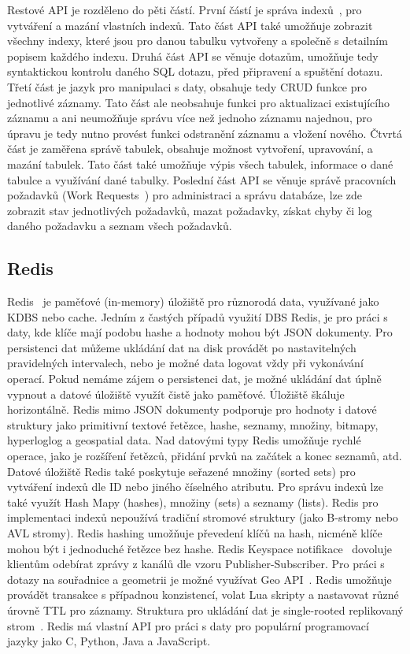 \documentclass[czech,master,dept460,male,csharp,cpdeclaration]{diploma}
\begin{document}
	Restové API je rozděleno do pěti částí. První částí je správa indexů~\cite{index}, pro vytváření a mazání vlastních indexů. Tato část API také umožňuje zobrazit všechny indexy, které jsou pro danou tabulku vytvořeny a společně s detailním popisem každého indexu. Druhá část API se věnuje dotazům, umožňuje tedy syntaktickou kontrolu daného SQL dotazu, před připravení a spuštění dotazu. Třetí část je jazyk pro manipulaci s daty, obsahuje tedy CRUD funkce pro jednotlivé záznamy. Tato část ale neobsahuje funkci pro aktualizaci existujícího záznamu a ani neumožňuje správu více než jednoho záznamu najednou, pro úpravu je tedy nutno provést funkci odstranění záznamu a vložení nového. Čtvrtá část je zaměřena správě tabulek, obsahuje možnost vytvoření, upravování, a mazání tabulek. Tato část také umožňuje výpis všech tabulek, informace o dané tabulce a využívání dané tabulky. Poslední část API se věnuje správě pracovních požadavků (Work Requests~\cite{oracle-work-requests-xd}) pro administraci a správu databáze, lze zde zobrazit stav jednotlivých požadavků, mazat požadavky, získat chyby či log daného požadavku a seznam všech požadavků.
		
	\subsection{Redis} \label{lab-redis}
	
	Redis~\cite{redis} je paměťové (in-memory) úložiště pro různorodá data, využívané jako KDBS nebo cache. Jedním z častých případů využití DBS Redis, je pro práci s daty, kde klíče mají podobu hashe a hodnoty mohou být JSON dokumenty. Pro persistenci dat můžeme ukládání dat na disk provádět po nastavitelných pravidelných intervalech, nebo je možné data logovat vždy při vykonávání operací. Pokud nemáme zájem o persistenci dat, je možné ukládání dat úplně vypnout a datové úložiště využít čistě jako paměťové. Úložiště škáluje horizontálně. Redis mimo JSON dokumenty podporuje pro hodnoty i datové struktury jako primitivní textové řetězce, hashe, seznamy, množiny, bitmapy, hyperloglog a geospatial data. Nad datovými typy Redis umožňuje rychlé operace, jako je rozšíření řetězců, přidání prvků na začátek a konec seznamů, atd. Datové úložiště Redis také poskytuje seřazené množiny (sorted sets) pro vytváření indexů dle ID nebo jiného číselného atributu. Pro správu indexů lze také využít Hash Mapy (hashes), množiny (sets) a seznamy (lists). Redis pro implementaci indexů nepoužívá tradiční stromové struktury (jako B-stromy nebo AVL stromy). Redis hashing umožňuje převedení klíčů na hash, nicméně klíče mohou být i jednoduché řetězce bez hashe. Redis Keyspace notifikace~\cite{redis-keyspace-not} dovoluje klientům odebírat zprávy z kanálů dle vzoru Publisher-Subscriber. Pro práci s dotazy na souřadnice a geometrii je možné využívat Geo API~\cite{redis-geospatial}. Redis umožňuje provádět transakce s případnou konzistencí, volat Lua skripty a nastavovat různé úrovně TTL pro záznamy. Struktura pro ukládání dat je single-rooted replikovaný strom~\cite{tree-replic}. Redis má vlastní API pro práci s daty pro populární programovací jazyky jako C, Python, Java a JavaScript.
	
\end{document}
